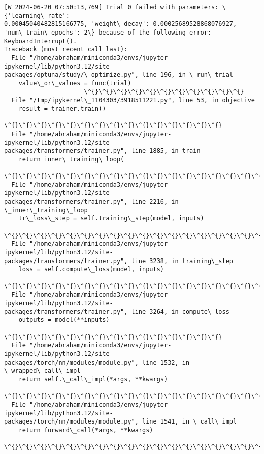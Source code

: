 \documentclass[11pt]{article}
\begin{document}
    \begin{Verbatim}[commandchars=\\\{\}]
[W 2024-06-20 07:50:13,769] Trial 0 failed with parameters: \{'learning\_rate':
0.00045040482815166775, 'weight\_decay': 0.00025689528868076927,
'num\_train\_epochs': 2\} because of the following error: KeyboardInterrupt().
Traceback (most recent call last):
  File "/home/abraham/miniconda3/envs/jupyter-ipykernel/lib/python3.12/site-
packages/optuna/study/\_optimize.py", line 196, in \_run\_trial
    value\_or\_values = func(trial)
                      \^{}\^{}\^{}\^{}\^{}\^{}\^{}\^{}\^{}\^{}\^{}
  File "/tmp/ipykernel\_1104303/3918511221.py", line 53, in objective
    result = trainer.train()
             \^{}\^{}\^{}\^{}\^{}\^{}\^{}\^{}\^{}\^{}\^{}\^{}\^{}\^{}\^{}
  File "/home/abraham/miniconda3/envs/jupyter-ipykernel/lib/python3.12/site-
packages/transformers/trainer.py", line 1885, in train
    return inner\_training\_loop(
           \^{}\^{}\^{}\^{}\^{}\^{}\^{}\^{}\^{}\^{}\^{}\^{}\^{}\^{}\^{}\^{}\^{}\^{}\^{}\^{}
  File "/home/abraham/miniconda3/envs/jupyter-ipykernel/lib/python3.12/site-
packages/transformers/trainer.py", line 2216, in \_inner\_training\_loop
    tr\_loss\_step = self.training\_step(model, inputs)
                   \^{}\^{}\^{}\^{}\^{}\^{}\^{}\^{}\^{}\^{}\^{}\^{}\^{}\^{}\^{}\^{}\^{}\^{}\^{}\^{}\^{}\^{}\^{}\^{}\^{}\^{}\^{}\^{}\^{}\^{}\^{}\^{}\^{}
  File "/home/abraham/miniconda3/envs/jupyter-ipykernel/lib/python3.12/site-
packages/transformers/trainer.py", line 3238, in training\_step
    loss = self.compute\_loss(model, inputs)
           \^{}\^{}\^{}\^{}\^{}\^{}\^{}\^{}\^{}\^{}\^{}\^{}\^{}\^{}\^{}\^{}\^{}\^{}\^{}\^{}\^{}\^{}\^{}\^{}\^{}\^{}\^{}\^{}\^{}\^{}\^{}\^{}
  File "/home/abraham/miniconda3/envs/jupyter-ipykernel/lib/python3.12/site-
packages/transformers/trainer.py", line 3264, in compute\_loss
    outputs = model(**inputs)
              \^{}\^{}\^{}\^{}\^{}\^{}\^{}\^{}\^{}\^{}\^{}\^{}\^{}\^{}\^{}
  File "/home/abraham/miniconda3/envs/jupyter-ipykernel/lib/python3.12/site-
packages/torch/nn/modules/module.py", line 1532, in \_wrapped\_call\_impl
    return self.\_call\_impl(*args, **kwargs)
           \^{}\^{}\^{}\^{}\^{}\^{}\^{}\^{}\^{}\^{}\^{}\^{}\^{}\^{}\^{}\^{}\^{}\^{}\^{}\^{}\^{}\^{}\^{}\^{}\^{}\^{}\^{}\^{}\^{}\^{}\^{}\^{}
  File "/home/abraham/miniconda3/envs/jupyter-ipykernel/lib/python3.12/site-
packages/torch/nn/modules/module.py", line 1541, in \_call\_impl
    return forward\_call(*args, **kwargs)
           \^{}\^{}\^{}\^{}\^{}\^{}\^{}\^{}\^{}\^{}\^{}\^{}\^{}\^{}\^{}\^{}\^{}\^{}\^{}\^{}\^{}\^{}\^{}\^{}\^{}\^{}\^{}\^{}\^{}

\end{Verbatim}
\end{document}
